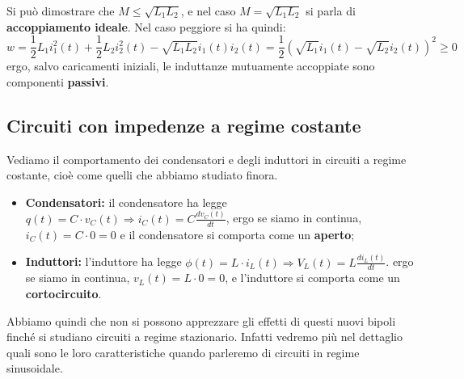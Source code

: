 \documentclass[a4paper,11pt]{article}
\begin{document}
Si può dimostrare che $ M \leq \sqrt{L_1 L_2}$, e nel caso $M = \sqrt{L_1 L_2}$ si parla di \textbf{accoppiamento ideale}. Nel caso peggiore si ha quindi:
$$
w = \frac{1}{2} L_1 i_1^2(t) + \frac{1}{2} L_2 i_2^2(t) - \sqrt{L_1 L_2} i_1(t) i_2(t) = \frac{1}{2}\left( \sqrt{L_1} i_1(t) - \sqrt{L_2} i_2(t) \right)^2 \geq 0
$$
ergo, salvo caricamenti iniziali, le induttanze mutuamente accoppiate sono componenti \textbf{passivi}.

\subsection{Circuiti con impedenze a regime costante}
Vediamo il comportamento dei condensatori e degli induttori in circuiti a regime costante, cioè come quelli che abbiamo studiato finora.
\begin{itemize}
	\item \textbf{Condensatori:} il condensatore ha legge $q(t) = C \cdot v_C(t) \Rightarrow i_C(t) = C \frac{dv_C(t)}{dt}$, ergo se siamo in continua, $i_C(t) = C \cdot 0 = 0$ e il condensatore si comporta come un \textbf{aperto};
	\item \textbf{Induttori:} l'induttore ha legge $\phi(t) = L \cdot i_L(t) \Rightarrow V_L(t) = L \frac{di_L(t)}{dt}$. ergo se siamo in continua, $v_L (t) = L \cdot 0 = 0$, e l'induttore si comporta come un \textbf{cortocircuito}.
\end{itemize}
Abbiamo quindi che non si possono apprezzare gli effetti di questi nuovi bipoli finché si studiano circuiti a regime stazionario.
Infatti vedremo più nel dettaglio quali sono le loro caratteristiche quando parleremo di circuiti in regime sinusoidale.
\end{document}
